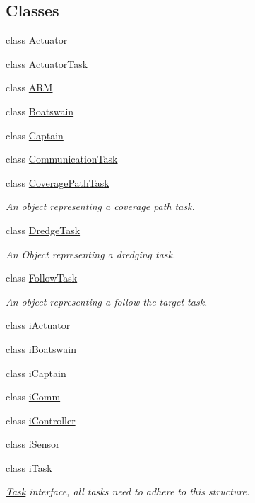 \subsection*{Classes}
\begin{DoxyCompactItemize}
\item 
class \hyperlink{classo_cpt_1_1_actuator}{Actuator}
\item 
class \hyperlink{classo_cpt_1_1_actuator_task}{Actuator\+Task}
\item 
class \hyperlink{classo_cpt_1_1_a_r_m}{A\+RM}
\item 
class \hyperlink{classo_cpt_1_1_boatswain}{Boatswain}
\item 
class \hyperlink{classo_cpt_1_1_captain}{Captain}
\item 
class \hyperlink{classo_cpt_1_1_communication_task}{Communication\+Task}
\item 
class \hyperlink{classo_cpt_1_1_coverage_path_task}{Coverage\+Path\+Task}
\begin{DoxyCompactList}\small\item\em An object representing a coverage path task. \end{DoxyCompactList}\item 
class \hyperlink{classo_cpt_1_1_dredge_task}{Dredge\+Task}
\begin{DoxyCompactList}\small\item\em An Object representing a dredging task. \end{DoxyCompactList}\item 
class \hyperlink{classo_cpt_1_1_follow_task}{Follow\+Task}
\begin{DoxyCompactList}\small\item\em An object representing a follow the target task. \end{DoxyCompactList}\item 
class \hyperlink{classo_cpt_1_1i_actuator}{i\+Actuator}
\item 
class \hyperlink{classo_cpt_1_1i_boatswain}{i\+Boatswain}
\item 
class \hyperlink{classo_cpt_1_1i_captain}{i\+Captain}
\item 
class \hyperlink{classo_cpt_1_1i_comm}{i\+Comm}
\item 
class \hyperlink{classo_cpt_1_1i_controller}{i\+Controller}
\item 
class \hyperlink{classo_cpt_1_1i_sensor}{i\+Sensor}
\item 
class \hyperlink{classo_cpt_1_1i_task}{i\+Task}
\begin{DoxyCompactList}\small\item\em \hyperlink{classo_cpt_1_1_task}{Task} interface, all tasks need to adhere to this structure. \end{DoxyCompactList}\item 

\end{DoxyCompactItemize}

